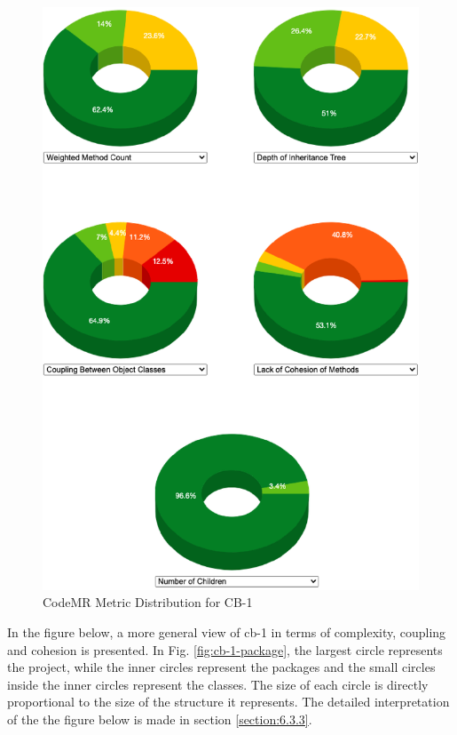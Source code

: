\begin{figure}[ht!]
    \centering
    \includegraphics[scale=1]{figures/cb-1-donuts.png}
    \caption{CodeMR Metric Distribution for CB-1}
    \label{fig:cb-1-donuts}
\end{figure}
\FloatBarrier

In the figure below, a more general view of cb-1 in terms of complexity, coupling and cohesion is presented. In Fig. \ref{fig:cb-1-package}, the largest circle represents the project, while the inner circles represent the packages and the small circles inside the inner circles represent the classes. The size of each circle is directly proportional to the size of the structure it represents. The detailed interpretation of the  the figure below is made in section \ref{section:6.3.3}.

